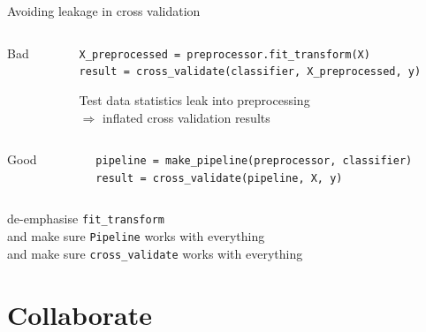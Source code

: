 \documentclass[aspectratio=169, 22pt]{beamer}
\newcommand{\hl}{\textcolor{usydred}}
\begin{document}
\begin{plain}{Avoiding leakage in cross validation}
	\begin{columns}[t]\begin{column}{0.1\textwidth}Bad\end{column}\begin{column}{.9\textwidth}
\verb|X_preprocessed = preprocessor.fit_transform(X)|\\
\verb|result = cross_validate(classifier, X_preprocessed, y)|

	\vspace{1em}
Test data statistics \hl{leak} into preprocessing\\
	$\Rightarrow$ inflated cross validation results
	\end{column}\end{columns}
	\vspace{1em}

	\begin{columns}[t]\begin{column}{0.1\textwidth}Good\end{column}\begin{column}{.9\textwidth}
\verb|pipeline = make_pipeline(preprocessor, classifier)|\\
\verb|result = cross_validate(pipeline, X, y)|
	\end{column}\end{columns}

	\vfill
	\begin{itemize}
			\p[Solution] de-emphasise \verb|fit_transform|\\
			and make sure \verb|Pipeline| works with everything\\
			and make sure \verb|cross_validate| works with everything
	\end{itemize}
\end{plain}


\section{Collaborate}
\end{document}
